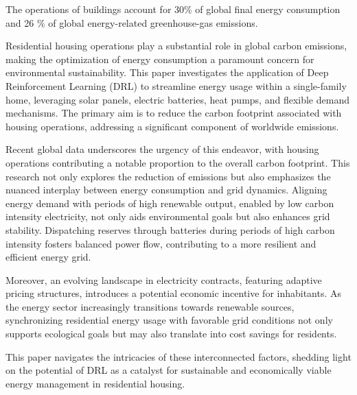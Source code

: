 The operations of buildings account for 30\% of global final energy consumption and 26 \%
of global energy-related greenhouse-gas emissions.\cite{IEA.06.01.2024}

Residential housing operations play a substantial role in global carbon emissions, making the optimization of energy consumption a paramount concern for environmental sustainability. This paper investigates the application of Deep Reinforcement Learning (DRL) to streamline energy usage within a single-family home, leveraging solar panels, electric batteries, heat pumps, and flexible demand mechanisms. The primary aim is to reduce the carbon footprint associated with housing operations, addressing a significant component of worldwide emissions.

Recent global data underscores the urgency of this endeavor, with housing operations contributing a notable proportion to the overall carbon footprint. This research not only explores the reduction of emissions but also emphasizes the nuanced interplay between energy consumption and grid dynamics. Aligning energy demand with periods of high renewable output, enabled by low carbon intensity electricity, not only aids environmental goals but also enhances grid stability. Dispatching reserves through batteries during periods of high carbon intensity fosters balanced power flow, contributing to a more resilient and efficient energy grid.

Moreover, an evolving landscape in electricity contracts, featuring adaptive pricing structures, introduces a potential economic incentive for inhabitants. As the energy sector increasingly transitions towards renewable sources, synchronizing residential energy usage with favorable grid conditions not only supports ecological goals but may also translate into cost savings for residents.

This paper navigates the intricacies of these interconnected factors, shedding light on the potential of DRL as a catalyst for sustainable and economically viable energy management in residential housing.